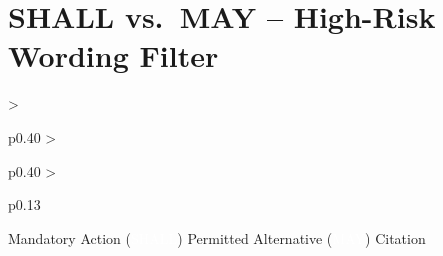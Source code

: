 \section{SHALL vs.\ MAY -- High-Risk Wording Filter}

\begin{cheattablethree}
  {>{\raggedright\arraybackslash}p{0.40\linewidth}
   >{\raggedright\arraybackslash}p{0.40\linewidth}
   >{\raggedright\arraybackslash}p{0.13\linewidth}}
  {Mandatory Action (\textcolor{white}{SHALL})}
  {Permitted Alternative (\textcolor{white}{MAY})}
  {Citation}


\end{cheattablethree}
